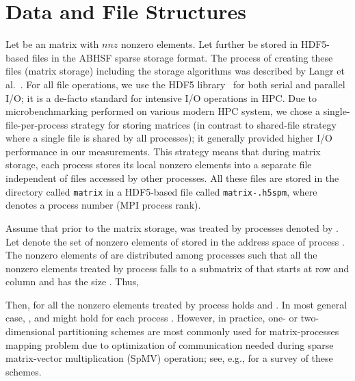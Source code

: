 \documentclass[10pt,a4paper]{article}
\providecommand{\nnz}{\ensuremath{\mathit{nnz}}\xspace}
\begin{document}
\section{Data and File Structures}

Let  be an  matrix with \nnz nonzero elements. Let further  be stored in HDF5-based files in the ABHSF sparse storage format. The process of creating these files (matrix storage) including the storage algorithms was described by Langr et al.~\cite{Langr:2013a}. For all file operations, we use the HDF5 library~\cite{HDFGroup:2013} for both serial and parallel I/O; it is a de-facto standard for intensive I/O operations in HPC. Due to microbenchmarking performed on various modern HPC system, we chose a single-file-per-process strategy for storing matrices (in contrast to shared-file strategy where a single file is shared by all processes); it generally provided higher I/O performance in our measurements. This strategy means that during matrix storage, each process stores its local nonzero elements into a separate file independent of files accessed by other processes. All these files are stored in the directory called \texttt{matrix} in a HDF5-based file called \texttt{matrix-}\texttt{.h5spm}, where  denotes a process number (MPI process rank).

Assume that prior to the matrix storage,  was treated by  processes denoted by . Let  denote the set of nonzero elements of  stored in the address space of process . The nonzero elements of  are distributed among processes such that all the nonzero elements treated by process  falls to a submatrix of  that starts at row  and column  and has the size . Thus,

Then, for all the nonzero elements  treated by process  holds  and . In most general case, ,  and  might hold for each process . However, in practice, one- or two-dimensional partitioning schemes are most commonly used for matrix-processes mapping problem due to optimization of communication needed during sparse matrix-vector multiplication (SpMV) operation; see, e.g., \cite{Catalyurek:2010} for a survey of these schemes.
\end{document}
